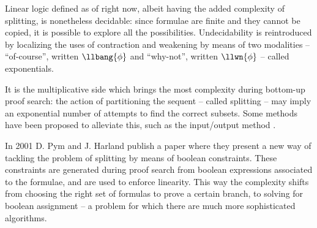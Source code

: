 Linear logic defined as of right now, albeit having the added complexity of splitting, is nonetheless decidable: since formulae are finite and they cannot be copied, it is possible to explore all the possibilities.
Undecidability is reintroduced by localizing the uses of contraction and weakening by means of two modalities --  ``of-course'', written $\llbang{\phi}$ and ``why-not'', written $\llwn{\phi}$ -- called exponentials.



It is the multiplicative side which brings the most complexity during bottom-up proof search: the action of partitioning the sequent -- called splitting -- may imply an exponential number of attempts to find the correct subsets.
Some methods have been proposed to alleviate this, such as the input/output method \cite{IO}.

In 2001 D. Pym and J. Harland publish a paper \cite{HarlandPym} where they present a new way of tackling the problem of splitting by means of boolean constraints.
These constraints are generated during proof search from boolean expressions associated to the formulae, and are used to enforce linearity.
This way the complexity shifts from choosing the right set of formulas to prove a certain branch, to solving for boolean assignment -- a problem for which there are much more sophisticated algorithms.

